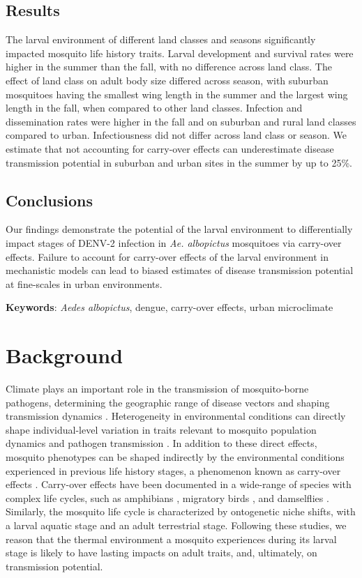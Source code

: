 \documentclass[12pt]{article}
\begin{document}
\subsection*{Results}
The larval environment of different land classes and seasons significantly impacted mosquito life history traits. Larval development and survival rates were higher in the summer than the fall, with no difference across land class. The effect of land class on adult body size differed across season, with suburban mosquitoes having the smallest wing length in the summer and the largest wing length in the fall, when compared to other land classes. Infection and dissemination rates were higher in the fall and on suburban and rural land classes compared to urban. Infectiousness did not differ across land class or season. We estimate that not accounting for carry-over effects can underestimate disease transmission potential in suburban and urban sites in the summer by up to 25\%.

\subsection*{Conclusions}
Our findings demonstrate the potential of the larval environment to differentially impact stages of DENV-2 infection in \textit{Ae. albopictus} mosquitoes via carry-over effects. Failure to account for carry-over effects of the larval environment in mechanistic models can lead to biased estimates of disease transmission potential at fine-scales in urban environments.

\textbf{Keywords}: \textit{Aedes albopictus}, dengue, carry-over effects, urban microclimate
\newpage

\doublespacing

\section*{Background}

Climate plays an important role in the transmission of mosquito-borne pathogens, determining the geographic range of disease vectors and shaping transmission dynamics \cite{reiter2001, parham2015}.
Heterogeneity in environmental conditions can directly shape individual-level variation in traits relevant to mosquito population dynamics \cite{delatte2009} and pathogen transmission \cite{murdock2012}.
In addition to these direct effects, mosquito phenotypes can be shaped indirectly by the environmental conditions experienced in previous life history stages, a phenomenon known as carry-over effects \cite{harrison2011}.
Carry-over effects have been documented in a wide-range of species with complex life cycles, such as amphibians \cite{vonesh2005}, migratory birds \cite{norris2006}, and damselflies \cite{deblock2005a}.
Similarly, the mosquito life cycle is characterized by ontogenetic niche shifts, with a larval aquatic stage and an adult terrestrial stage.
Following these studies, we reason that the thermal environment a mosquito experiences during its larval stage is likely to have lasting impacts on adult traits, and, ultimately, on transmission potential.
\end{document}
